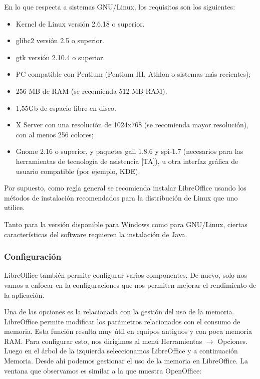 \documentclass[12pt]{article}
\begin{document}
En lo que respecta a sistemas GNU/Linux, los requisitos son los siguientes:
\begin{itemize}
\item Kernel de Linux versión 2.6.18 o superior.
\item glibc2 versión 2.5 o superior.
\item gtk versión 2.10.4 o superior.
\item PC compatible con Pentium (Pentium III, Athlon o sistemas más recientes);
\item 256 MB de RAM (se recomienda 512 MB RAM).
\item 1,55Gb de espacio libre en disco.
\item X Server con una resolución de 1024x768 (se recomienda mayor resolución), con al menos 256 colores;
\item Gnome 2.16 o superior, y paquetes gail 1.8.6 y spi-1.7 (necesarios para las herramientas de tecnología de asistencia [TA]), u otra interfaz gráfica de usuario compatible (por ejemplo, KDE).
\end{itemize}
Por supuesto, como regla general se recomienda instalar LibreOffice usando los métodos de instalación recomendados para la distribución de Linux que uno utilice. 

Tanto para la versión disponible para Windows como para GNU/Linux, ciertas características del software requieren la instalación de Java.

\subsubsection{Configuración}

LibreOffice también permite configurar varios componentes. De nuevo, solo nos vamos a enfocar en la configuraciones que nos permiten mejorar el rendimiento de la aplicación.

Una de las opciones es la relacionada con la gestión del uso de la memoria. LibreOffice permite modificar los parámetros relacionados con el consumo de memoria. Esta función resulta muy útil en equipos antiguos y con poca memoria RAM. Para configurar esto, nos dirigimos al menú Herramientas $\rightarrow $ Opciones. Luego en el árbol de la izquierda seleccionamos LibreOffice y a continuación Memoria. Desde ahí podemos gestionar el uso de la memoria en LibreOffice. La ventana que observamos es similar a la que muestra OpenOffice:
\end{document}

